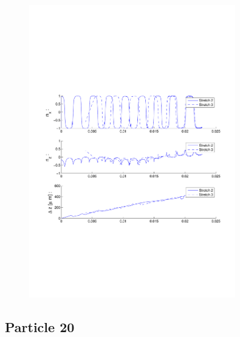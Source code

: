 \begin{figure}[ H]

\centering

\includegraphics[width=0.8\textwidth]{Images/Particle 19/Stretch2.pdf}

\end{figure}



 


\subsection{Particle 20}

